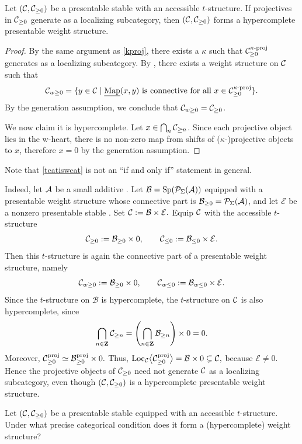 \documentclass[a4paper,10pt, oneside]{amsart}
\begin{document}
\begin{prop}\label{tcatiswcat}
	Let $(\mathcal{C},\mathcal{C}_{\geq0})$ be a presentable stable \infcat with an accessible $t$-structure. If projectives in $\mathcal{C}_{\geq0}$ generate \mcc as a localizing subcategory, then $(\mathcal{C},\mathcal{C}_{\geq0})$ forms a hypercomplete  presentable weight structure.
\end{prop}
\begin{proof}
	By the same argument as \cref{kproj}, there exists a $\kappa$ such that $\mathcal{C}_{\geq0}^{\kappa\text{-}\mathrm{proj}}$ generates \mcc as a localizing subcategory. 
	By \cite[Theorem 6.3]{nikolaus2026unbounded}, there exists a weight structure on $\mathcal{C}$ such that $$\mathcal{C}_{w \geq 0}=\{y \in \mathcal{C}\mid \underline{\operatorname{Map}}(x, y) \text{ is connective for all } x \in \mathcal{C}_{\geq0}^{\kappa\text{-}\mathrm{proj}}\}.$$
	By the generation assumption, we conclude that $\mathcal{C}_{w\geq0}=\mathcal{C}_{\geq0}$.
	
	We now claim it is hypercomplete. Let $x\in\bigcap_{n}\mathcal{C}_{\geq n}$. Since each projective object lies in the w-heart, there is no non-zero map from shifts of ($\kappa$-)projective objects to $x$, therefore $x=0$ by the generation assumption.
\end{proof}
\begin{rem}
	Note that \cref{tcatiswcat} is not an ``if and only if'' statement in general. 
	
	Indeed, let $\mathcal{A}$ be a small additive \infcat. Let $\mathcal{B}=\mathrm{Sp}(\mathcal{P}_{\Sigma}(\mathcal{A}))$ equipped with a presentable weight structure whose connective part is $\mathcal{B}_{\geq0}=\mathcal{P}_{\Sigma}(\mathcal{A})$, and let $\mathcal{E}$ be a nonzero presentable stable \infcat. Set
	$
	\mathcal{C}:=\mathcal{B}\times \mathcal{E}.
	$
	Equip $\mathcal{C}$ with the accessible $t$-structure
	\[
	\mathcal{C}_{\geq0}:=\mathcal{B}_{\geq0}\times 0,
	\qquad
	\mathcal{C}_{\leq0}:=\mathcal{B}_{\leq0}\times \mathcal{E}.
	\]
	Then this $t$-structure is again the connective part of a presentable weight structure, namely
	\[
	\mathcal{C}_{w\geq0}:=\mathcal{B}_{\geq0}\times 0,
	\qquad
	\mathcal{C}_{w\leq0}:=\mathcal{B}_{w\leq0}\times \mathcal{E}.
	\]
	Since the $t$-structure on $\mathcal{B}$ is hypercomplete, the $t$-structure on $\mathcal{C}$ is also hypercomplete, since
	\[
	\bigcap_{n\in \mathbf{Z}}\mathcal{C}_{\geq n}
	=
	\left(\bigcap_{n\in \mathbf{Z}}\mathcal{B}_{\geq n}\right)\times 0
	=
	0.
	\]
	Moreover,
	$
	\mathcal{C}_{\geq0}^{\mathrm{proj}}
	\simeq
	\mathcal{B}_{\geq0}^{\mathrm{proj}}\times 0.
	$
	Thus, 
	$
	\mathrm{Loc}_{\mathcal{C}}\bigl<\mathcal{C}_{\geq0}^{\mathrm{proj}}\bigr>
	=
	\mathcal{B}\times 0
	\subsetneq
	\mathcal{C},
	$
	because $\mathcal{E}\neq 0$. Hence the projective objects of $\mathcal{C}_{\geq0}$ need not generate $\mathcal{C}$ as a localizing subcategory, even though $(\mathcal{C},\mathcal{C}_{\geq0})$ is a hypercomplete presentable weight structure.
\end{rem}
\begin{quest}
	Let $(\mathcal{C},\mathcal{C}_{\geq0})$ be a presentable stable \infcat equipped with an accessible $t$-structure. Under what precise categorical condition does it form a (hypercomplete) weight structure?
\end{quest}

\end{document}
